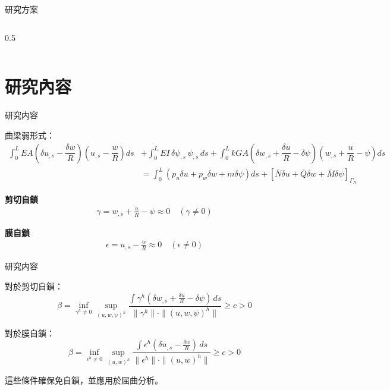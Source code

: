 \documentclass[aspectratio=169,xcolor=dvipsnames]{beamer}
\begin{document}
\begin{frame}{研究方案}
\begin{columns}[onlytextwidth,T]
\begin{column}{0.5\textwidth}

\end{column}

\end{columns}

\end{frame}

\section{研究內容}

\begin{frame}{研究内容}

曲梁弱形式：
\small
\begin{align*}
\int_0^L EA \left( \delta u_{,s} - \dfrac{\delta w}{R} \right) \left( u_{,s} - \dfrac{w}{R} \right) ds
&+ \int_0^L EI \, \delta \psi_{,s} \, \psi_{,s} \, ds 
+ \int_0^L kGA \left( \delta w_{,s} + \dfrac{\delta u}{R} - \delta \psi \right) \left( w_{,s} + \dfrac{u}{R} - \psi \right) ds \\
&= \int_0^L (p_u \delta u + p_w \delta w + m \delta \psi) ds 
+ \left[ \bar{N} \delta u + \bar{Q} \delta w + \bar{M} \delta \psi \right]_{\Gamma_N}
\end{align*}

\textbf{剪切自鎖}
\begin{align*}
\gamma = w_{,s} + \frac{u}{R} - \psi \approx 0 \quad (\gamma \neq 0)
\end{align*}

\textbf{膜自鎖}
\begin{align*}
\epsilon = u_{,s} - \frac{w}{R} \approx 0 \quad (\epsilon \neq 0)
\end{align*}

\end{frame}

\begin{frame}{研究内容}

對於剪切自鎖：
\small
\[ \beta = \inf_{\gamma^h \neq 0} \sup_{(u,w,\psi)^h} \frac{\int \gamma^h (\delta w_{,s} + \frac{\delta u}{R} - \delta \psi) \, ds}{\|\gamma^h\| \cdot \|(u,w,\psi)^h\|} \geq c > 0 \]

對於膜自鎖：
\small
\[ \beta = \inf_{\epsilon^h \neq 0} \sup_{(u,w)^h} \frac{\int \epsilon^h (\delta u_{,s} - \frac{\delta w}{R}) \, ds}{\|\epsilon^h\| \cdot \|(u,w)^h\|} \geq c > 0 \]

這些條件確保免自鎖，並應用於屈曲分析。

\end{frame}
\end{document}
